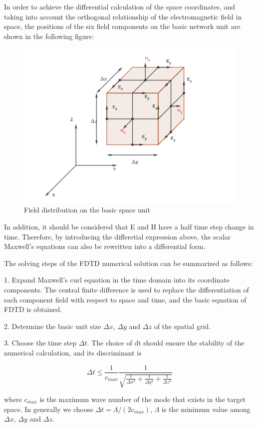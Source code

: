 \documentclass[]{article}
\begin{document}
In order to achieve the differential calculation of the space coordinates, and taking into account the orthogonal relationship of the electromagnetic field in space, the positions of the six field components on the basic network unit are shown in the following figure:

\begin{figure}[H]
	\centering
	\includegraphics[width=0.7\linewidth]{figures/figure8}
	\caption{Field distribution on the basic space unit}
	\label{fig:figure8}
\end{figure}

In addition, it should be considered that E and H have a half time step change in time. Therefore, by introducing the differetial expression above, the scalar Maxwell's equations can also be rewritten into a differential form.

The solving steps of the FDTD numerical solution can be summarized as follows:

1. Expand Maxwell's curl equation in the time domain into its coordinate components. The central finite difference is used to replace the differentiation of each component field with respect to space and time, and the basic equation of FDTD is obtained.

2. Determine the basic unit size $\Delta x$, $\Delta y$ and $\Delta z$ of the spatial grid.

3. Choose the time step $\Delta t$. The choice of dt should ensure the stability of the numerical calculation, and its discriminant is

$$\Delta t \leq \frac{1}{c_{max}} \frac{1}{\sqrt{\frac{1}{\Delta x^2} + \frac{1}{\Delta y^2} + \frac{1}{\Delta z^2}}}$$

where $c_{max}$ is the maximum wave number of the mode that exists in the target space. In generally we choose $\Delta t = \Lambda / (2c_{max})$, $\Lambda$ is the minimum value among $\Delta x$, $\Delta y$ and $\Delta z$.
\end{document}
